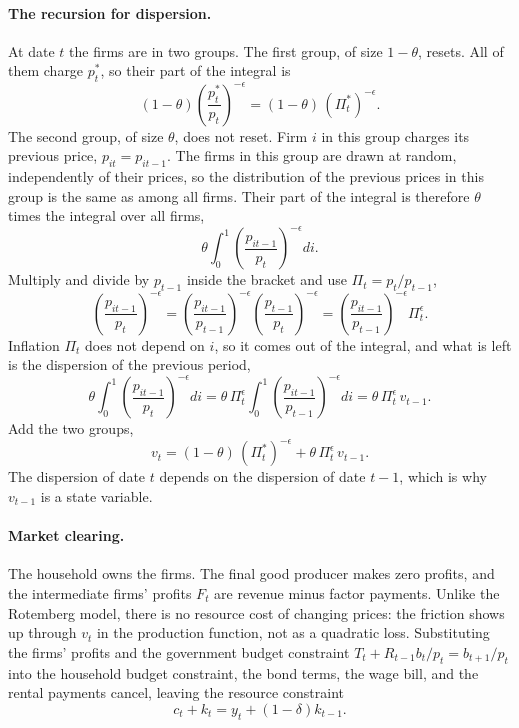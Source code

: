 \documentclass[11pt]{article}
\begin{document}
\paragraph{The recursion for dispersion.} At date $t$ the firms are in two groups. The first group, of size $1-\theta$, resets. All of them charge $p_t^{*}$, so their part of the integral is
\begin{equation*}
(1-\theta) \left( \frac{p_t^{*}}{p_t} \right)^{-\epsilon} = (1-\theta)\, (\Pi_t^{*})^{-\epsilon} .
\end{equation*}
The second group, of size $\theta$, does not reset. Firm $i$ in this group charges its previous price, $p_{it} = p_{it-1}$. The firms in this group are drawn at random, independently of their prices, so the distribution of the previous prices in this group is the same as among all firms. Their part of the integral is therefore $\theta$ times the integral over all firms,
\begin{equation*}
\theta \int_0^1 \left( \frac{p_{it-1}}{p_t} \right)^{-\epsilon} di .
\end{equation*}
Multiply and divide by $p_{t-1}$ inside the bracket and use $\Pi_t = p_t/p_{t-1}$,
\begin{equation*}
\left( \frac{p_{it-1}}{p_t} \right)^{-\epsilon}
= \left( \frac{p_{it-1}}{p_{t-1}} \right)^{-\epsilon} \left( \frac{p_{t-1}}{p_t} \right)^{-\epsilon}
= \left( \frac{p_{it-1}}{p_{t-1}} \right)^{-\epsilon} \Pi_t^{\epsilon} .
\end{equation*}
Inflation $\Pi_t$ does not depend on $i$, so it comes out of the integral, and what is left is the dispersion of the previous period,
\begin{equation*}
\theta \int_0^1 \left( \frac{p_{it-1}}{p_t} \right)^{-\epsilon} di
= \theta\, \Pi_t^{\epsilon} \int_0^1 \left( \frac{p_{it-1}}{p_{t-1}} \right)^{-\epsilon} di
= \theta\, \Pi_t^{\epsilon}\, v_{t-1} .
\end{equation*}
Add the two groups,
\begin{equation*}
v_t = (1-\theta)\, (\Pi_t^{*})^{-\epsilon} + \theta\, \Pi_t^{\epsilon}\, v_{t-1} .
\end{equation*}
The dispersion of date $t$ depends on the dispersion of date $t-1$, which is why $v_{t-1}$ is a state variable.

\paragraph{Market clearing.} The household owns the firms. The final good producer makes zero profits, and the intermediate firms' profits $F_t$ are revenue minus factor payments. Unlike the Rotemberg model, there is no resource cost of changing prices: the friction shows up through $v_t$ in the production function, not as a quadratic loss. Substituting the firms' profits and the government budget constraint $T_t + R_{t-1} b_t/p_t = b_{t+1}/p_t$ into the household budget constraint, the bond terms, the wage bill, and the rental payments cancel, leaving the resource constraint
\begin{equation*}
c_t + k_t = y_t + (1-\delta) k_{t-1} .
\end{equation*}
\end{document}
